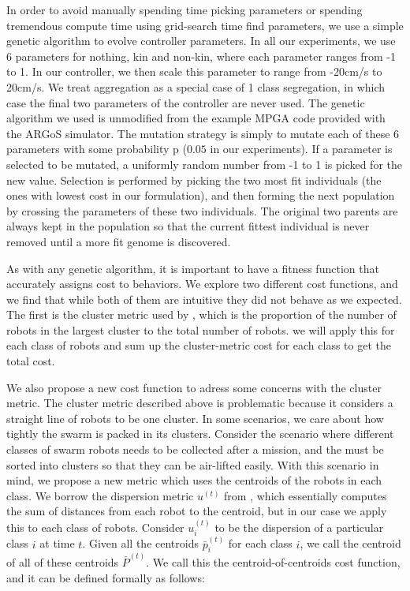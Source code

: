 \documentclass[conference]{IEEEtran}
\begin{document}
  In order to avoid manually spending time picking parameters or spending tremendous compute time using grid-search time find parameters, we use a simple genetic algorithm to evolve controller parameters. In all our experiments, we use 6 parameters for nothing, kin and non-kin, where each parameter ranges from -1 to 1. In our controller, we then scale this parameter to range from -20cm/s to 20cm/s. We treat aggregation as a special case of 1 class segregation, in which case the final two parameters of the controller are never used. The genetic algorithm we used is unmodified from the example MPGA code provided with the ARGoS simulator. The mutation strategy is simply to mutate each of these 6 parameters with some probability p ($0.05$ in our experiments). If a parameter is selected to be mutated, a uniformly random number from -1 to 1 is picked for the new value. Selection is performed by picking the two most fit individuals (the ones with lowest cost in our formulation), and then forming the next population by crossing the parameters of these two individuals. The original two parents are always kept in the population so that the current fittest individual is never removed until a more fit genome is discovered.

  As with any genetic algorithm, it is important to have a fitness function that accurately assigns cost to behaviors. We explore two different cost functions, and we find that while both of them are intuitive they did not behave as we expected. The first is the cluster metric used by \cite{gauci_self-organized_2014}, which is the proportion of the number of robots in the largest cluster to the total number of robots. we will apply this for each class of robots and sum up the cluster-metric cost for each class to get the total cost.

  We also propose a new cost function to adress some concerns with the cluster metric. The cluster metric described above is problematic because it considers a straight line of robots to be one cluster. In some scenarios, we care about how tightly the swarm is packed in its clusters. Consider the scenario where different classes of swarm robots needs to be collected after a mission, and the must be sorted into clusters so that they can be air-lifted easily. With this scenario in mind, we propose a new metric which uses the centroids of the robots in each class. We borrow the dispersion metric $u^{(t)}$ from \cite{gauci_self-organized_2014}, which essentially computes the sum of distances from each robot to the centroid, but in our case we apply this to each class of robots. Consider $u_i^{(t)}$ to be the dispersion of a particular class $i$ at time $t$. Given all the centroids $\bar{p}_i^{(t)}$ for each class $i$, we call the centroid of all of these centroids $\bar{P}^{(t)}$. We call this the centroid-of-centroids cost function, and it can be defined formally as follows:
\end{document}
